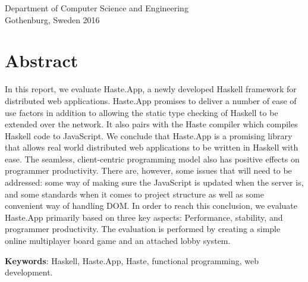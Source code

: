 \documentclass[a4paper]{article}
\begin{document}
Department of Computer Science and Engineering\\
Gothenburg, Sweden 2016


\normalsize



\vfill


\newpage
\section*{Abstract}
In this report, we evaluate Haste.App, a newly developed Haskell framework for distributed web applications. Haste.App promises to deliver a number of ease of use factors in addition to allowing the static type checking of Haskell to be extended over the network. It also pairs with the Haste compiler which compiles Haskell code to JavaScript. We conclude that Haste.App is a promising library that allows real world distributed web applications to be written in Haskell with ease. The seamless, client-centric programming model also has positive effects on programmer productivity. There are, however, some issues that will need to be addressed: some way of making sure the JavaScript is updated when the server is, and some standards when it comes to project structure as well as some convenient way of handling DOM. In order to reach this conclusion, we evaluate Haste.App primarily based on three key aspects: Performance, stability, and programmer productivity. The evaluation is performed by creating a simple online multiplayer board game and an attached lobby system.



\vfill
\textbf{Keywords}:
Haskell, Haste.App, Haste, functional programming, web development.
\newpage
\end{document}
